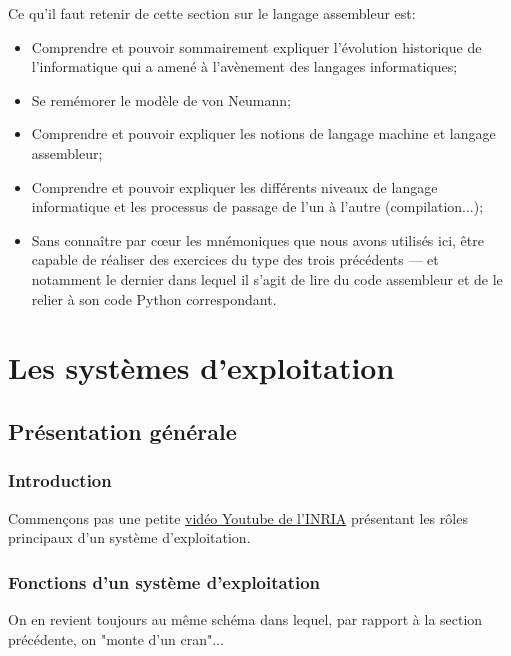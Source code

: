 \documentclass[12pt]{article}
\begin{document}
 	\begin{MonRet}
	 	Ce qu'il faut retenir de cette section sur le langage assembleur est:
	 	\begin{itemize}
	 		\item Comprendre et pouvoir sommairement expliquer l'évolution historique de l'informatique qui a amené à l'avènement des langages informatiques;
	 		\item Se remémorer le modèle de von Neumann;
	 		\item Comprendre et pouvoir expliquer les notions de langage machine et langage assembleur;
	 		\item Comprendre et pouvoir expliquer les différents niveaux de langage informatique et les processus de passage de l'un à l'autre (compilation...);
	 		\item Sans connaître par cœur les mnémoniques que nous avons utilisés ici, être capable de réaliser des exercices du type des trois précédents --- et notamment le dernier dans lequel il s'agit de lire du code assembleur et de le relier à son code Python correspondant.
	 	\end{itemize}
	\end{MonRet}
		
	\pagebreak
	\section{Les systèmes d'exploitation}
	
	\subsection{Présentation générale}
	
	\subsubsection*{Introduction}
	
	\begin{MaVid}
		Commençons pas une petite  \href{https://www.youtube.com/watch?v=SpCP2oaCx8A&feature=youtu.be}{vidéo Youtube de l'INRIA} présentant les rôles principaux d'un système d'exploitation.
	\end{MaVid}

	\subsubsection*{Fonctions d'un système d'exploitation}
	
	On en revient toujours au même schéma dans lequel, par rapport à la section précédente, on "monte d'un cran"...
	
\end{document}

